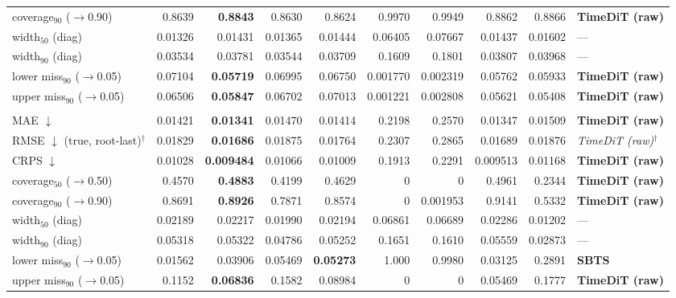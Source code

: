 \documentclass[11pt,a4paper]{article}
\begin{document}
\begin{landscape}
\begin{center}
\begin{tabular}{lrrrrrrrrl}
coverage$_{90}$ ($\to$0.90) & 0.8639 & \textbf{0.8843} & 0.8630 & 0.8624 & 0.9970 & 0.9949 & 0.8862 & 0.8866 & \textbf{TimeDiT (raw)} \\
width$_{50}$ (diag) & 0.01326 & 0.01431 & 0.01365 & 0.01444 & 0.06405 & 0.07667 & 0.01437 & 0.01602 & --- \\
width$_{90}$ (diag) & 0.03534 & 0.03781 & 0.03544 & 0.03709 & 0.1609 & 0.1801 & 0.03807 & 0.03968 & --- \\
lower miss$_{90}$ ($\to$0.05) & 0.07104 & \textbf{0.05719} & 0.06995 & 0.06750 & 0.001770 & 0.002319 & 0.05762 & 0.05933 & \textbf{TimeDiT (raw)} \\
upper miss$_{90}$ ($\to$0.05) & 0.06506 & \textbf{0.05847} & 0.06702 & 0.07013 & 0.001221 & 0.002808 & 0.05621 & 0.05408 & \textbf{TimeDiT (raw)} \\
\addlinespace
\multicolumn{10}{l}{\textbf{rv ($M$ scalar)}} \\
MAE $\downarrow$ & 0.01421 & \textbf{0.01341} & 0.01470 & 0.01414 & 0.2198 & 0.2570 & 0.01347 & 0.01509 & \textbf{TimeDiT (raw)} \\
RMSE $\downarrow$ (true, root-last)$^{\dagger}$ & 0.01829 & \textbf{0.01686} & 0.01875 & 0.01764 & 0.2307 & 0.2865 & 0.01689 & 0.01876 & \textit{TimeDiT (raw)}$^{\dagger}$ \\
CRPS $\downarrow$ & 0.01028 & \textbf{0.009484} & 0.01066 & 0.01009 & 0.1913 & 0.2291 & 0.009513 & 0.01168 & \textbf{TimeDiT (raw)} \\
coverage$_{50}$ ($\to$0.50) & 0.4570 & \textbf{0.4883} & 0.4199 & 0.4629 & 0 & 0 & 0.4961 & 0.2344 & \textbf{TimeDiT (raw)} \\
coverage$_{90}$ ($\to$0.90) & 0.8691 & \textbf{0.8926} & 0.7871 & 0.8574 & 0 & 0.001953 & 0.9141 & 0.5332 & \textbf{TimeDiT (raw)} \\
width$_{50}$ (diag) & 0.02189 & 0.02217 & 0.01990 & 0.02194 & 0.06861 & 0.06689 & 0.02286 & 0.01202 & --- \\
width$_{90}$ (diag) & 0.05318 & 0.05322 & 0.04786 & 0.05252 & 0.1651 & 0.1610 & 0.05559 & 0.02873 & --- \\
lower miss$_{90}$ ($\to$0.05) & 0.01562 & 0.03906 & 0.05469 & \textbf{0.05273} & 1.000 & 0.9980 & 0.03125 & 0.2891 & \textbf{SBTS} \\
upper miss$_{90}$ ($\to$0.05) & 0.1152 & \textbf{0.06836} & 0.1582 & 0.08984 & 0 & 0 & 0.05469 & 0.1777 & \textbf{TimeDiT (raw)} \\
\bottomrule
\end{tabular}
\end{center}
\end{landscape}
\end{document}
